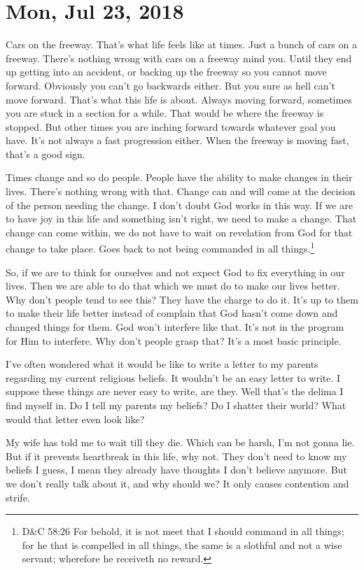 \section{Mon, Jul 23, 2018}

Cars on the freeway. That's what life feels like at times. Just a bunch of cars on a
freeway. There's nothing wrong with cars on a freeway mind you. Until they end up
getting into an accident, or backing up the freeway so you cannot move forward.
Obviously you can't go backwards either. But you sure as hell can't move forward.
That's what this life is about. Always  moving forward, sometimes you are stuck in a
section for a while. That would be where the freeway is stopped. But other times you
are inching forward towards whatever goal you have. It's not always a fast
progression either. When the freeway is moving fast, that's a good sign.

Times change and so do people. People have the ability to make changes in their
lives. There's nothing wrong with that. Change can and will come at the decision of
the person needing the change. I don't doubt God works in this way. If we are to have
joy in this life and something isn't right, we need to make a change. That change can
come within, we do not have to wait on revelation from God for that change to take
place. Goes back to not being commanded in all things.\footnote{D\&C 58:26 For behold, 
it is not meet that I should command in all things; for he that is compelled in all 
things, the same is a slothful and not a wise servant; wherefore he receiveth no 
reward.}

So, if we are to think for ourselves and not expect God to fix everything in our
lives. Then we are able to do that which we must do to make our lives better. Why
don't people tend to see this? They have the charge to do it. It's up to them to make
their life better instead of complain that God hasn't come down and changed things
for them. God won't interfere like that. It's not in the program for Him to
interfere. Why don't people grasp that? It's a most basic principle.

I've often wondered what it would be like to write a letter to my parents regarding
my current religious beliefs. It wouldn't be an easy letter to write. I suppose these
things are never easy to write, are they. Well that's the delima I find myself in. Do
I tell my parents my beliefs? Do I shatter their world? What would that letter even
look like?

My wife has told me to wait till they die. Which can be harsh, I'm not gonna lie. But
if it prevents heartbreak in this life, why not. They don't need to know my beliefs I
guess, I mean they already have thoughts I don't believe anymore. But we don't really
talk about it, and why should we? It only causes contention and strife.

